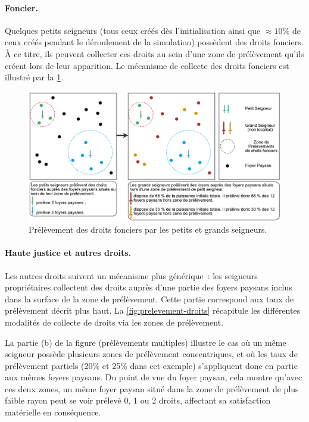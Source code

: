 \paragraph{Foncier.}
Quelques petits seigneurs (tous ceux créés dès l'initialisation ainsi que $\approx 10\%$ de ceux créés pendant le déroulement de la simulation) possèdent des droits fonciers.
À ce titre, ils peuvent collecter ces droits au sein d'une zone de prélèvement qu'ils créent lors de leur apparition.
Le mécanisme de collecte des droits fonciers est illustré par la \cref{fig:prelevement-fonciers}.

\begin{figure}[H]
	\centering
	\includegraphics[width=1\linewidth]{img/prelevements_foncier.pdf}
	\caption{Prélèvement des droits fonciers par les petits et grands seigneurs.}
	\label{fig:prelevement-fonciers}
\end{figure}

\paragraph{Haute justice et autres droits.}
Les autres droits suivent un mécanisme plus générique : les seigneurs propriétaires collectent des droits auprès d'une partie des foyers paysans inclus dans la surface de la zone de prélèvement.
Cette partie correspond aux \og taux de prélèvement\fg{} décrit plus haut. La \cref{fig:prelevement-droits} récapitule les différentes modalités de collecte de droits via les zones de prélèvement.

La partie (b) de la figure (prélèvements multiples) illustre le cas où un même seigneur possède plusieurs zones de prélèvement concentriques, et où les taux de prélèvement partiels (20\% et 25\% dans cet exemple) s'appliquent donc en partie aux mêmes foyers paysans.
Du point de vue du foyer paysan, cela montre qu'avec ces deux zones, un même foyer paysan situé dans la zone de prélèvement de plus faible rayon peut se voir prélevé 0, 1 ou 2 droits, affectant sa satisfaction matérielle en conséquence.

